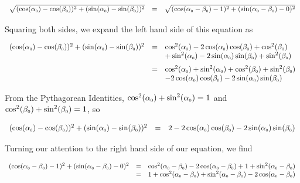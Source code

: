 \documentclass{ximera}
\begin{document}
\[ \begin{array}{rcl}

\sqrt{(\cos(\alpha_{\mbox{\tiny $0$}}) - \cos(\beta_{\mbox{\tiny $0$}}))^2 + (\sin(\alpha_{\mbox{\tiny $0$}}) - \sin(\beta_{\mbox{\tiny $0$}}))^2 } & = & \sqrt{(\cos(\alpha_{\mbox{\tiny $0$}} - \beta_{\mbox{\tiny $0$}}) - 1)^2 + (\sin(\alpha_{\mbox{\tiny $0$}} - \beta_{\mbox{\tiny $0$}}) - 0)^2} \\ \end{array} \]

Squaring both sides, we expand the left hand side of this equation as

\[ \begin{array}{rcl}
(\cos(\alpha_{\mbox{\tiny $0$}}) - \cos(\beta_{\mbox{\tiny $0$}}))^2 + (\sin(\alpha_{\mbox{\tiny $0$}}) - \sin(\beta_{\mbox{\tiny $0$}}))^2 
& = &  
\cos^2(\alpha_{\mbox{\tiny $0$}}) - 2\cos(\alpha_{\mbox{\tiny $0$}})\cos(\beta_{\mbox{\tiny $0$}}) + \cos^2(\beta_{\mbox{\tiny $0$}}) \\  
& & + \sin^2(\alpha_{\mbox{\tiny $0$}}) - 2\sin(\alpha_{\mbox{\tiny $0$}})\sin(\beta_{\mbox{\tiny $0$}})  +  \sin^2(\beta_{\mbox{\tiny $0$}}) \\ [6pt]
& = & \cos^2(\alpha_{\mbox{\tiny $0$}}) + \sin^2(\alpha_{\mbox{\tiny $0$}}) + \cos^2(\beta_{\mbox{\tiny $0$}}) + \sin^2(\beta_{\mbox{\tiny $0$}}) \\
& & -  2\cos(\alpha_{\mbox{\tiny $0$}})\cos(\beta_{\mbox{\tiny $0$}}) - 2\sin(\alpha_{\mbox{\tiny $0$}})\sin(\beta_{\mbox{\tiny $0$}}) \end{array}\]

From the Pythagorean Identities, $\cos^2(\alpha_{\mbox{\tiny $0$}}) + \sin^2(\alpha_{\mbox{\tiny $0$}}) = 1$ and $\cos^2(\beta_{\mbox{\tiny $0$}}) + \sin^2(\beta_{\mbox{\tiny $0$}}) = 1$, so

\[ \begin{array}{rcl}
(\cos(\alpha_{\mbox{\tiny $0$}}) - \cos(\beta_{\mbox{\tiny $0$}}))^2 + (\sin(\alpha_{\mbox{\tiny $0$}}) - \sin(\beta_{\mbox{\tiny $0$}}))^2 
& = & 2  - 2\cos(\alpha_{\mbox{\tiny $0$}})\cos(\beta_{\mbox{\tiny $0$}}) - 2\sin(\alpha_{\mbox{\tiny $0$}})\sin(\beta_{\mbox{\tiny $0$}}) \end{array}\]

Turning our attention to the right hand side of our equation, we find

\[ \begin{array}{rcl}
(\cos(\alpha_{\mbox{\tiny $0$}} - \beta_{\mbox{\tiny $0$}}) - 1)^2 + (\sin(\alpha_{\mbox{\tiny $0$}} - \beta_{\mbox{\tiny $0$}}) - 0)^2 & = & \cos^2(\alpha_{\mbox{\tiny $0$}} - \beta_{\mbox{\tiny $0$}}) - 2\cos(\alpha_{\mbox{\tiny $0$}} - \beta_{\mbox{\tiny $0$}}) + 1 + \sin^2(\alpha_{\mbox{\tiny $0$}} - \beta_{\mbox{\tiny $0$}}) \\ 
& = & 1 +  \cos^2(\alpha_{\mbox{\tiny $0$}} - \beta_{\mbox{\tiny $0$}}) + \sin^2(\alpha_{\mbox{\tiny $0$}} - \beta_{\mbox{\tiny $0$}}) - 2\cos(\alpha_{\mbox{\tiny $0$}} - \beta_{\mbox{\tiny $0$}}) \\
\end{array} \]
\end{document}
